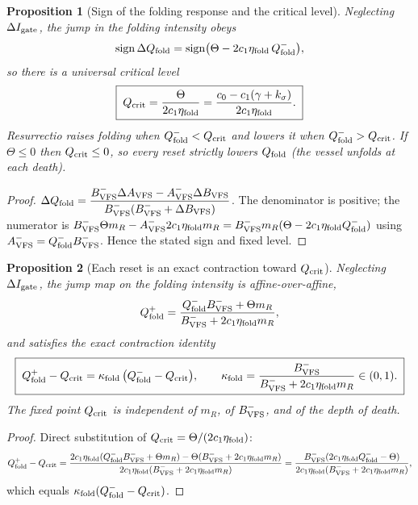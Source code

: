 \documentclass[11pt,a4paper,oneside]{book}
\newcommand{\Igate}{I_{\rm gate}}
\newcommand{\Avfs}{A_{\rm VFS}}
\newcommand{\Bvfs}{B_{\rm VFS}}
\newcommand{\Qf}{Q_{\rm fold}}
\newcommand{\etaf}{\eta_{\rm fold}}
\theoremstyle{plain}
\newtheorem{proposition}{Proposition}[chapter]
\theoremstyle{definition}
\theoremstyle{remark}
\begin{document}
\begin{proposition}[Sign of the folding response and the critical level]\label{foldingtrigger:prop:sign}
Neglecting $\Delta\Igate$, the jump in the folding intensity obeys
\begin{equation}
\operatorname{sign}\Delta\Qf=\operatorname{sign}\bigl(\Theta-2c_1\etaf\,\Qf^{-}\bigr),
\end{equation}
so there is a universal critical level
\begin{equation}
\boxed{\;Q_{\rm crit}=\frac{\Theta}{2c_1\etaf}=\frac{c_0-c_1(\gamma+k_\sigma)}{2c_1\etaf}.\;}
\end{equation}
Resurrectio raises folding when $\Qf^{-}<Q_{\rm crit}$ and lowers it when $\Qf^{-}>Q_{\rm crit}$. If
$\Theta\le0$ then $Q_{\rm crit}\le0$, so every reset strictly lowers $\Qf$ (the vessel unfolds at each
death).
\end{proposition}
\begin{proof}
$\Delta\Qf=\dfrac{\Bvfs^{-}\Delta\Avfs-\Avfs^{-}\Delta\Bvfs}{\Bvfs^{-}(\Bvfs^{-}+\Delta\Bvfs)}$. The
denominator is positive; the numerator is
$\Bvfs^{-}\Theta m_R-\Avfs^{-}2c_1\etaf m_R=\Bvfs^{-}m_R(\Theta-2c_1\etaf\Qf^{-})$ using
$\Avfs^{-}=\Qf^{-}\Bvfs^{-}$. Hence the stated sign and fixed level.
\end{proof}

\begin{proposition}[Each reset is an exact contraction toward $Q_{\rm crit}$]\label{foldingtrigger:prop:contract}
Neglecting $\Delta\Igate$, the jump map on the folding intensity is affine-over-affine,
\begin{equation}
\Qf^{+}=\frac{\Qf^{-}\Bvfs^{-}+\Theta m_R}{\Bvfs^{-}+2c_1\etaf m_R},
\end{equation}
and satisfies the exact contraction identity
\begin{equation}
\boxed{\;\Qf^{+}-Q_{\rm crit}=\kappa_{\rm fold}\,\bigl(\Qf^{-}-Q_{\rm crit}\bigr),
\qquad
\kappa_{\rm fold}=\frac{\Bvfs^{-}}{\Bvfs^{-}+2c_1\etaf m_R}\in(0,1).\;}
\end{equation}
The fixed point $Q_{\rm crit}$ is independent of $m_R$, of $\Bvfs^{-}$, and of the depth of death.
\end{proposition}
\begin{proof}
Direct substitution of $Q_{\rm crit}=\Theta/(2c_1\etaf)$:
\[
\Qf^{+}-Q_{\rm crit}
=\frac{2c_1\etaf(\Qf^{-}\Bvfs^{-}+\Theta m_R)-\Theta(\Bvfs^{-}+2c_1\etaf m_R)}{2c_1\etaf(\Bvfs^{-}+2c_1\etaf m_R)}
=\frac{\Bvfs^{-}(2c_1\etaf\Qf^{-}-\Theta)}{2c_1\etaf(\Bvfs^{-}+2c_1\etaf m_R)},
\]
which equals $\kappa_{\rm fold}(\Qf^{-}-Q_{\rm crit})$.
\end{proof}
\end{document}
